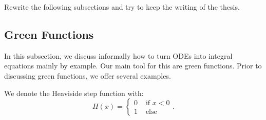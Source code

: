 Rewrite the following subsections and try to keep the
writing of the thesis.

\subsection{Green Functions}
In this subsection, we discuss informally how to turn ODEs into integral equations mainly
by example. Our main tool for this are green functions.
Prior to discussing green functions, we offer several
examples.

\begin{notation}[$H$]
    We denote the Heaviside step function with:
    \begin{equation}
        H(x) = \begin{cases}
            0 & \text{ if } x<0 \\
            1 & \text{ else }
        \end{cases}.
    \end{equation}
\end{notation}

